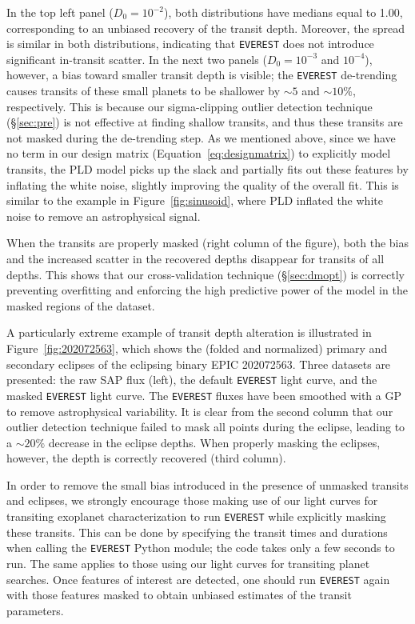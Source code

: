 \documentclass[]{emulateapj}
\begin{document}
In the top left panel ($D_0 = 10^{-2}$), both distributions have medians equal to 1.00, corresponding
to an unbiased recovery of the transit depth. Moreover, the spread is similar in both
distributions, indicating that \texttt{EVEREST} does not introduce significant in-transit
scatter. In the next two panels ($D_0 = 10^{-3}$ and $10^{-4}$), however, a bias toward
smaller transit depth is visible; the \texttt{EVEREST} de-trending causes transits
of these small planets to be shallower by $\sim 5$ and $\sim 10\%$, respectively. This
is because our sigma-clipping outlier detection technique (\S\ref{sec:pre}) is not effective 
at finding shallow transits, and thus these transits are not masked during the de-trending
step. As we mentioned above, since we have no term in our design
matrix (Equation~\ref{eq:designmatrix}) to explicitly model transits, the PLD model
picks up the slack and partially fits out these features by inflating the white noise,
slightly improving the quality of the overall fit. This is similar to the example in 
Figure~\ref{fig:sinusoid}, where PLD inflated the white noise to remove an astrophysical
signal. 

When the transits are properly masked (right column of the figure), both the bias
and the increased scatter in the recovered depths disappear for transits of all
depths. This shows that our cross-validation technique (\S\ref{sec:dmopt}) is
correctly preventing overfitting and enforcing the high predictive power of the model
in the masked regions of the dataset. 

A particularly extreme example of transit depth alteration is illustrated in Figure~\ref{fig:202072563}, which shows 
the (folded and normalized) primary and secondary eclipses of the eclipsing binary EPIC 202072563. 
Three datasets are presented: the raw SAP flux (left), the default \texttt{EVEREST} light curve, 
and the masked \texttt{EVEREST} light curve. 
The \texttt{EVEREST} fluxes have been smoothed with a GP to 
remove astrophysical variability. It is clear from the second column that our outlier detection technique failed to 
mask all points during the eclipse, leading to a $\sim 20\%$ decrease in the eclipse
depths. When properly masking the eclipses, however, the depth is correctly recovered 
(third column).

In order to remove the small bias introduced in the presence of unmasked
transits and eclipses, we strongly encourage those making use of our light curves for transiting exoplanet
characterization to run \texttt{EVEREST} while explicitly masking these transits. 
This can be done by specifying the transit times and durations when calling the \texttt{EVEREST}
Python module; the code takes only a few seconds to run. The same applies to those using our light
curves for transiting planet searches. Once features of interest are detected, one
should run \texttt{EVEREST} again with those features masked to obtain unbiased
estimates of the transit parameters.
\end{document}
